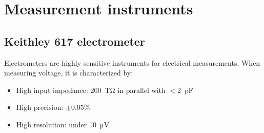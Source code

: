 \section{Measurement instruments}
\subsection{Keithley 617 electrometer}
Electrometers are highly sensitive instruments for electrical measurements.
When measuring voltage, it is characterized by:
\begin{itemize}
    \item High input impedance:
\SI{200}{\tera\ohm} in parallel with $<$\SI{2}{\pico\farad}
\item High precision: $\pm0.05\%$
\item High resolution: under \SI{10}{\micro\volt}
\end{itemize}
